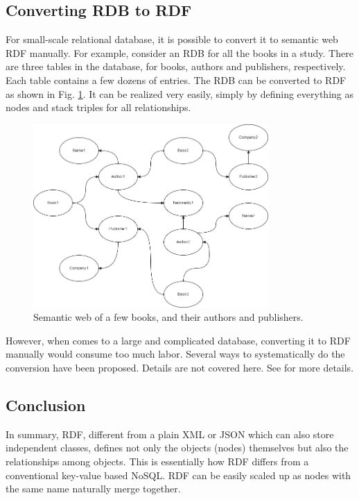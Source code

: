 \subsection{Converting RDB to RDF}

For small-scale relational database, it is possible to convert it to semantic web RDF manually. For example, consider an RDB for all the books in a study. There are three tables in the database, for books, authors and publishers, respectively. Each table contains a few dozens of entries. The RDB can be converted to RDF as shown in Fig. \ref{fig:bookexp}. It can be realized very easily, simply by defining everything as nodes and stack triples for all relationships.
\begin{figure}[htbp]
	\centering
	\includegraphics[width=0.8\textwidth]{./chapters/ch-semanticwebarchitecture/figures/bookexp.png}
	\caption{Semantic web of a few books, and their authors and publishers.}
	\label{fig:bookexp}
\end{figure}

However, when comes to a large and complicated database, converting it to RDF manually would consume too much labor. Several ways to systematically do the conversion have been proposed. Details are not covered here. See \cite{michel2014survey} for more details.

\subsection{Conclusion}

In summary, RDF, different from a plain XML or JSON which can also store independent classes, defines not only the objects (nodes) themselves but also the relationships among objects. This is essentially how RDF differs from a conventional key-value based NoSQL. RDF can be easily scaled up as nodes with the same name naturally merge together.

